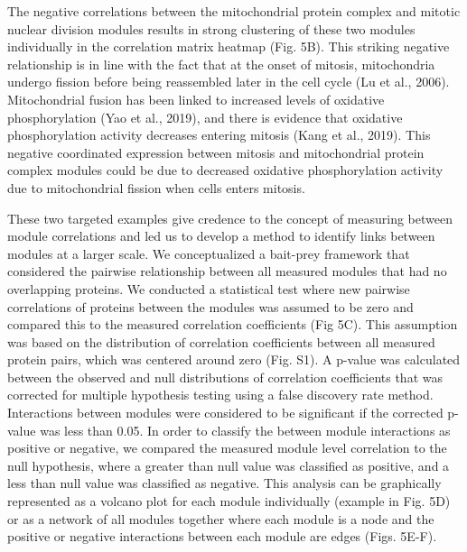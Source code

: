 The negative correlations between the mitochondrial protein complex and mitotic nuclear division modules results in strong clustering of these two modules individually in the correlation matrix heatmap (Fig. 5B). This striking negative relationship is in line with the fact that at the onset of mitosis, mitochondria undergo fission before being reassembled later in the cell cycle (Lu et al., 2006). Mitochondrial fusion has been linked to increased levels of oxidative phosphorylation (Yao et al., 2019), and there is evidence that oxidative phosphorylation activity decreases entering mitosis (Kang et al., 2019). This negative coordinated expression between mitosis and mitochondrial protein complex modules could be due to decreased oxidative phosphorylation activity due to mitochondrial fission when cells enters mitosis.

These two targeted examples give credence to the concept of measuring between module correlations and led us to develop a method to identify links between modules at a larger scale. We conceptualized a bait-prey framework that considered the pairwise relationship between all measured modules that had no overlapping proteins. We conducted a statistical test where new pairwise correlations of proteins between the modules was assumed to be zero and compared this to the measured correlation coefficients (Fig 5C). This assumption was based on the distribution of correlation coefficients between all measured protein pairs, which was centered around zero (Fig. S1). A p-value was calculated between the observed and null distributions of correlation coefficients that was corrected for multiple hypothesis testing using a false discovery rate method. Interactions between modules were considered to be significant if the corrected p-value was less than 0.05. In order to classify the between module interactions as positive or negative, we compared the measured module level correlation to the null hypothesis, where a greater than null value was classified as positive, and a less than null value was classified as negative. This analysis can be graphically represented as a volcano plot for each module individually (example in Fig. 5D) or as a network of all modules together where each module is a node and the positive or negative interactions between each module are edges (Figs. 5E-F).

